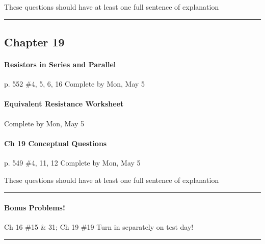 \documentclass[10pt]{exam}
\begin{document}
{\sc These questions should have at least one full sentence 
      of explanation}


\hrule



\subsection*{Chapter 19}




\paragraph{Resistors in Series and Parallel} p. 552 \#4, 5, 6, 16
\dotfill Complete by Mon, May 5




\paragraph{Equivalent Resistance Worksheet} 
\dotfill Complete by Mon, May 5






\paragraph{Ch 19 Conceptual Questions} p. 549 \#4, 11, 12
\dotfill Complete by Mon, May 5
   
{\sc These questions should have at least one full sentence 
      of explanation}


\hrule




\paragraph{Bonus Problems!} Ch 16 \#15 \& 31; Ch 19 \#19
\dotfill Turn in separately on test day!

\vspace{1em}
\hrule
\end{document}
